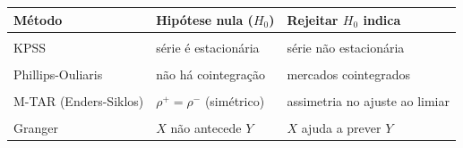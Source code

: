 \begin{quadro}[!h]
\centering
\caption{\label{quad:metodos}Métodos, hipóteses e interpretação.}
\centering
\fontsize{9}{11}\selectfont
\begin{tabular}[t]{>{\raggedright\arraybackslash}p{3.4cm}>{\raggedright\arraybackslash}p{5.6cm}>{\raggedright\arraybackslash}p{6cm}}
\toprule
\textbf{Método} & \textbf{Hipótese nula ($H_0$)} & \textbf{Rejeitar $H_0$ indica}\\
\midrule
\cellcolor{gray!10}{ADF / Phillips-Perron} & \cellcolor{gray!10}{série tem raiz unitária} & \cellcolor{gray!10}{série estacionária}\\
KPSS & série é estacionária & série não estacionária\\
\cellcolor{gray!10}{Johansen (traço)} & \cellcolor{gray!10}{posto de cointegração $=r$} & \cellcolor{gray!10}{há relação(ões) de longo prazo}\\
Phillips-Ouliaris & não há cointegração & mercados cointegrados\\
\cellcolor{gray!10}{ECM assimétrico (Wald)} & \cellcolor{gray!10}{$\alpha^{+}=\alpha^{-}$ (simétrico)} & \cellcolor{gray!10}{transmissão assimétrica}\\
M-TAR (Enders-Siklos) & $\rho^{+}=\rho^{-}$ (simétrico) & assimetria no ajuste ao limiar\\
\cellcolor{gray!10}{Hansen-Seo} & \cellcolor{gray!10}{VECM linear} & \cellcolor{gray!10}{há efeito de limiar (TVECM)}\\
Granger & $X$ não antecede $Y$ & $X$ ajuda a prever $Y$\\
\bottomrule
\end{tabular}
\end{quadro}
